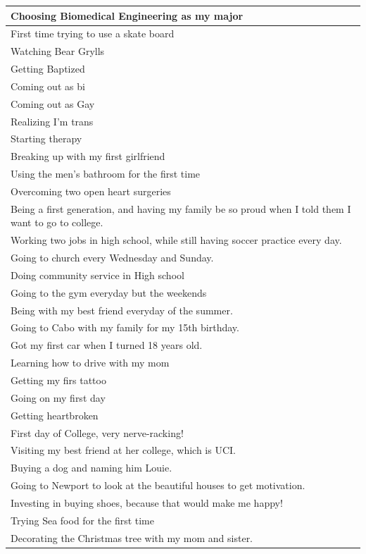 \documentclass[
  .7em,
  letterpaper,
  DIV=11,
  numbers=noendperiod]{scrartcl}
\begin{document}
\begin{table}
\begin{tabular}{l}
\hline
Choosing Biomedical Engineering as my major\\
\hline
First time trying to use a skate board\\
\hline
Watching Bear Grylls\\
\hline
Getting Baptized\\
\hline
Coming out as bi\\
\hline
Coming out as Gay\\
\hline
Realizing I'm trans\\
\hline
Starting therapy\\
\hline
Breaking up with my first girlfriend\\
\hline
Using the men's bathroom for the first time\\
\hline
Overcoming two open heart surgeries\\
\hline
Being a first generation, and having my family be so proud when I told them I want to go to college.\\
\hline
Working two jobs in high school, while still having soccer practice every day.\\
\hline
Going to church every Wednesday and Sunday.\\
\hline
Doing community service in High school\\
\hline
Going to the gym everyday but the weekends\\
\hline
Being with my best friend everyday of the summer.\\
\hline
Going to Cabo with my family for my 15th birthday.\\
\hline
Got my first car when I turned 18 years old.\\
\hline
Learning how to drive with my mom\\
\hline
Getting my firs tattoo\\
\hline
Going on my first day\\
\hline
Getting heartbroken\\
\hline
First day of College, very nerve-racking!\\
\hline
Visiting my best friend at her college, which is UCI.\\
\hline
Buying a dog and naming him Louie.\\
\hline
Going to Newport to look at the beautiful houses to get motivation.\\
\hline
Investing in buying shoes, because that would make me happy!\\
\hline
Trying Sea food for the first time\\
\hline
Decorating the Christmas tree with my mom and sister.\\

\end{tabular}
\end{table}
\end{document}
